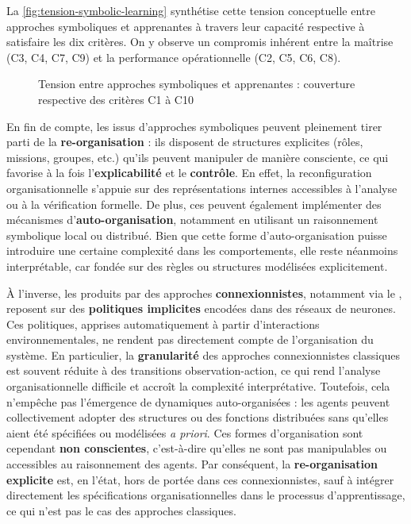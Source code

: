 La \autoref{fig:tension-symbolic-learning} synthétise cette tension conceptuelle entre approches symboliques et apprenantes à travers leur capacité respective à satisfaire les dix critères. On y observe un compromis inhérent entre la maîtrise (C3, C4, C7, C9) et la performance opérationnelle (C2, C5, C6, C8).

\begin{figure}[H]
    \centering
    \resizebox{\textwidth}{!}{%
        
    }
    \caption{Tension entre approches symboliques et apprenantes : couverture respective des critères C1 à C10}
    \label{fig:tension-symbolic-learning}
\end{figure}

En fin de compte, les  issus d'approches symboliques peuvent pleinement tirer parti de la \textbf{re-organisation} : ils disposent de structures explicites (rôles, missions, groupes, etc.) qu'ils peuvent manipuler de manière consciente, ce qui favorise à la fois l'\textbf{explicabilité} et le \textbf{contrôle}. En effet, la reconfiguration organisationnelle s'appuie sur des représentations internes accessibles à l'analyse ou à la vérification formelle. De plus, ces  peuvent également implémenter des mécanismes d'\textbf{auto-organisation}, notamment en utilisant un raisonnement symbolique local ou distribué. Bien que cette forme d'auto-organisation puisse introduire une certaine complexité dans les comportements, elle reste néanmoins interprétable, car fondée sur des règles ou structures modélisées explicitement.

À l'inverse, les  produits par des approches \textbf{connexionnistes}, notamment via le , reposent sur des \textbf{politiques implicites} encodées dans des réseaux de neurones. Ces politiques, apprises automatiquement à partir d'interactions environnementales, ne rendent pas directement compte de l'organisation du système. En particulier, la \textbf{granularité} des approches connexionnistes classiques est souvent réduite à des transitions observation-action, ce qui rend l'analyse organisationnelle difficile et accroît la complexité interprétative. Toutefois, cela n'empêche pas l'émergence de dynamiques auto-organisées : les agents peuvent collectivement adopter des structures ou des fonctions distribuées sans qu'elles aient été spécifiées ou modélisées \textit{a priori}. Ces formes d'organisation sont cependant \textbf{non conscientes}, c'est-à-dire qu'elles ne sont pas manipulables ou accessibles au raisonnement des agents. Par conséquent, la \textbf{re-organisation explicite} est, en l'état, hors de portée dans ces  connexionnistes, sauf à intégrer directement les spécifications organisationnelles dans le processus d'apprentissage, ce qui n'est pas le cas des approches  classiques.

